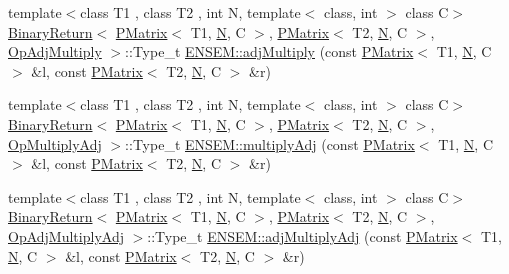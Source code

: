 \begin{DoxyCompactItemize}
\item 
{\footnotesize template$<$class T1 , class T2 , int N, template$<$ class, int $>$ class C$>$ }\\\mbox{\hyperlink{structENSEM_1_1BinaryReturn}{Binary\+Return}}$<$ \mbox{\hyperlink{classENSEM_1_1PMatrix}{P\+Matrix}}$<$ T1, \mbox{\hyperlink{operator__name__util_8cc_a7722c8ecbb62d99aee7ce68b1752f337}{N}}, C $>$, \mbox{\hyperlink{classENSEM_1_1PMatrix}{P\+Matrix}}$<$ T2, \mbox{\hyperlink{operator__name__util_8cc_a7722c8ecbb62d99aee7ce68b1752f337}{N}}, C $>$, \mbox{\hyperlink{structENSEM_1_1OpAdjMultiply}{Op\+Adj\+Multiply}} $>$\+::Type\+\_\+t \mbox{\hyperlink{group__primmatrix_gac28cbe7440b96e5650ac2c201b8c5ac2}{E\+N\+S\+E\+M\+::adj\+Multiply}} (const \mbox{\hyperlink{classENSEM_1_1PMatrix}{P\+Matrix}}$<$ T1, \mbox{\hyperlink{operator__name__util_8cc_a7722c8ecbb62d99aee7ce68b1752f337}{N}}, C $>$ \&l, const \mbox{\hyperlink{classENSEM_1_1PMatrix}{P\+Matrix}}$<$ T2, \mbox{\hyperlink{operator__name__util_8cc_a7722c8ecbb62d99aee7ce68b1752f337}{N}}, C $>$ \&r)
\item 
{\footnotesize template$<$class T1 , class T2 , int N, template$<$ class, int $>$ class C$>$ }\\\mbox{\hyperlink{structENSEM_1_1BinaryReturn}{Binary\+Return}}$<$ \mbox{\hyperlink{classENSEM_1_1PMatrix}{P\+Matrix}}$<$ T1, \mbox{\hyperlink{operator__name__util_8cc_a7722c8ecbb62d99aee7ce68b1752f337}{N}}, C $>$, \mbox{\hyperlink{classENSEM_1_1PMatrix}{P\+Matrix}}$<$ T2, \mbox{\hyperlink{operator__name__util_8cc_a7722c8ecbb62d99aee7ce68b1752f337}{N}}, C $>$, \mbox{\hyperlink{structENSEM_1_1OpMultiplyAdj}{Op\+Multiply\+Adj}} $>$\+::Type\+\_\+t \mbox{\hyperlink{group__primmatrix_gaf37104443218a1cbaa8ab848065a0a09}{E\+N\+S\+E\+M\+::multiply\+Adj}} (const \mbox{\hyperlink{classENSEM_1_1PMatrix}{P\+Matrix}}$<$ T1, \mbox{\hyperlink{operator__name__util_8cc_a7722c8ecbb62d99aee7ce68b1752f337}{N}}, C $>$ \&l, const \mbox{\hyperlink{classENSEM_1_1PMatrix}{P\+Matrix}}$<$ T2, \mbox{\hyperlink{operator__name__util_8cc_a7722c8ecbb62d99aee7ce68b1752f337}{N}}, C $>$ \&r)
\item 
{\footnotesize template$<$class T1 , class T2 , int N, template$<$ class, int $>$ class C$>$ }\\\mbox{\hyperlink{structENSEM_1_1BinaryReturn}{Binary\+Return}}$<$ \mbox{\hyperlink{classENSEM_1_1PMatrix}{P\+Matrix}}$<$ T1, \mbox{\hyperlink{operator__name__util_8cc_a7722c8ecbb62d99aee7ce68b1752f337}{N}}, C $>$, \mbox{\hyperlink{classENSEM_1_1PMatrix}{P\+Matrix}}$<$ T2, \mbox{\hyperlink{operator__name__util_8cc_a7722c8ecbb62d99aee7ce68b1752f337}{N}}, C $>$, \mbox{\hyperlink{structENSEM_1_1OpAdjMultiplyAdj}{Op\+Adj\+Multiply\+Adj}} $>$\+::Type\+\_\+t \mbox{\hyperlink{group__primmatrix_ga81c788e54ea0f4c4de97e7bfa9d7cd89}{E\+N\+S\+E\+M\+::adj\+Multiply\+Adj}} (const \mbox{\hyperlink{classENSEM_1_1PMatrix}{P\+Matrix}}$<$ T1, \mbox{\hyperlink{operator__name__util_8cc_a7722c8ecbb62d99aee7ce68b1752f337}{N}}, C $>$ \&l, const \mbox{\hyperlink{classENSEM_1_1PMatrix}{P\+Matrix}}$<$ T2, \mbox{\hyperlink{operator__name__util_8cc_a7722c8ecbb62d99aee7ce68b1752f337}{N}}, C $>$ \&r)

\end{DoxyCompactItemize}
